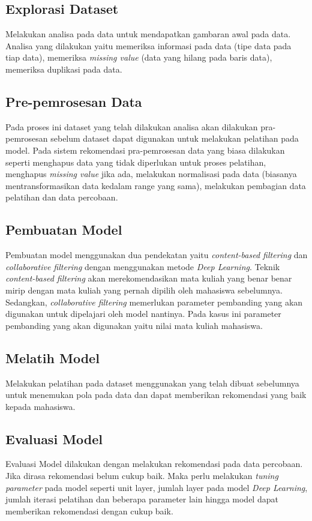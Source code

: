 \begin{adjustwidth}{1em}{0pt}
  \subsection{Explorasi Dataset}
  Melakukan analisa pada data untuk mendapatkan gambaran awal pada data. Analisa yang dilakukan yaitu
  memeriksa informasi pada data (tipe data pada tiap data), memeriksa \emph{missing value} {(data yang hilang pada baris data)},
  memeriksa duplikasi pada data.

  \subsection{Pre-pemrosesan Data}
  Pada proses ini dataset yang telah dilakukan analisa akan dilakukan pra-pemrosesan sebelum dataset dapat digunakan
  untuk melakukan pelatihan pada model. Pada sistem rekomendasi pra-pemrosesan data yang biasa dilakukan seperti menghapus data
  yang tidak diperlukan untuk proses pelatihan, menghapus \emph{missing value} jika ada, melakukan normalisasi pada data (biasanya mentransformasikan data kedalam range yang sama),
  melakukan pembagian data pelatihan dan data percobaan.

  \subsection{Pembuatan Model}
  Pembuatan model menggunakan dua pendekatan yaitu \emph{content-based filtering} dan \emph{collaborative filtering} dengan menggunakan metode \emph{Deep Learning}. Teknik
  \emph{content-based filtering} akan merekomendasikan mata kuliah yang benar benar mirip dengan mata kuliah yang pernah dipilih oleh mahasiswa sebelumnya. Sedangkan, \emph{collaborative filtering}
  memerlukan parameter pembanding yang akan digunakan untuk dipelajari oleh model nantinya. Pada kasus ini parameter pembanding yang akan digunakan yaitu nilai mata kuliah mahasiswa.

  \subsection{Melatih Model}
  Melakukan pelatihan pada dataset menggunakan yang telah dibuat sebelumnya untuk menemukan pola pada data dan dapat memberikan rekomendasi yang baik kepada mahasiswa.

  \subsection{Evaluasi Model}
  Evaluasi Model dilakukan dengan melakukan rekomendasi pada data percobaan. Jika dirasa rekomendasi belum cukup baik. Maka perlu melakukan
  \emph{tuning parameter} pada model seperti unit layer, jumlah layer pada model \emph{Deep Learning}, jumlah iterasi pelatihan dan beberapa parameter lain hingga model dapat memberikan rekomendasi dengan cukup baik.


\end{adjustwidth}
